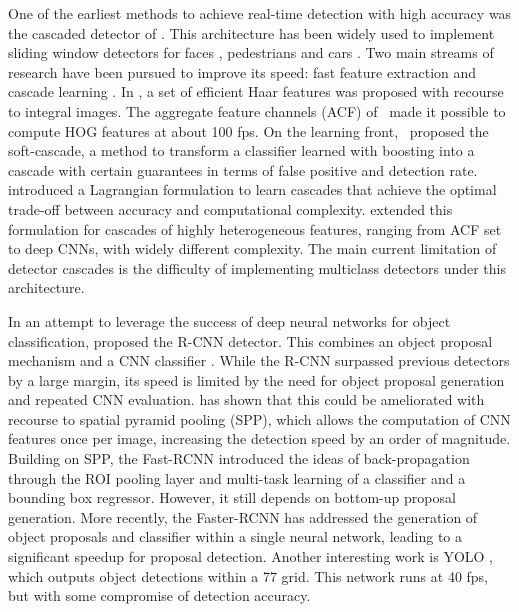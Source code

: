 \documentclass[runningheads]{llncs}
\begin{document}
One of the earliest methods to achieve real-time detection with  high
accuracy was the cascaded detector of \cite{DBLP:journals/ijcv/ViolaJ04}.
This architecture has been widely used to implement sliding window
detectors for faces \cite{DBLP:journals/ijcv/ViolaJ04,DBLP:conf/cvpr/BourdevB05}, pedestrians \cite{DBLP:journals/pami/DollarABP14,DBLP:conf/iccv/CaiSV15} and cars \cite{DBLP:journals/tits/Ohn-BarT15}.
Two main streams of research have been pursued to improve its speed:
fast feature extraction \cite{DBLP:journals/ijcv/ViolaJ04,DBLP:journals/pami/DollarABP14} and cascade learning
\cite{DBLP:conf/cvpr/BourdevB05,DBLP:journals/jmlr/SaberianV14,DBLP:conf/iccv/CaiSV15}. In \cite{DBLP:journals/ijcv/ViolaJ04}, a set
of efficient Haar features was proposed with recourse to integral images.
The aggregate feature channels (ACF) of~\cite{DBLP:journals/pami/DollarABP14}
made it possible to compute HOG features at about 100 fps. On the learning
front,~\cite{DBLP:conf/cvpr/BourdevB05} proposed the soft-cascade, a
method to transform a classifier learned with boosting  into a cascade with
certain guarantees in terms of false positive and detection rate.
\cite{DBLP:journals/jmlr/SaberianV14} introduced a Lagrangian formulation
to learn cascades that achieve the optimal trade-off between accuracy and
computational complexity. \cite{DBLP:conf/iccv/CaiSV15} extended this
formulation for cascades of highly heterogeneous features, ranging from ACF
set to deep CNNs, with widely different complexity. The main current
limitation of detector cascades is the difficulty of implementing multiclass
detectors under this architecture.

In an attempt to leverage the success of deep neural networks for object
classification, \cite{DBLP:conf/cvpr/GirshickDDM14} proposed the R-CNN
detector. This combines an object proposal mechanism
\cite{DBLP:conf/iccv/SandeUGS11} and a CNN classifier
\cite{DBLP:conf/nips/KrizhevskySH12}. While the R-CNN surpassed previous
detectors \cite{DBLP:journals/pami/FelzenszwalbGMR10,DBLP:conf/iccv/WangYZL13}
by a large margin, its speed is limited by the
need for object proposal generation and repeated CNN evaluation.
\cite{DBLP:conf/eccv/HeZR014} has shown that this could be ameliorated
with recourse to spatial pyramid pooling (SPP), which allows the computation
of CNN features once per image, increasing
the detection speed by an order of magnitude. Building on SPP,
the Fast-RCNN \cite{DBLP:conf/iccv/Girshick15} introduced
the ideas of back-propagation through the ROI pooling layer and multi-task
learning of a classifier and a bounding box regressor. However, it still
depends on bottom-up proposal generation. More recently, the
Faster-RCNN \cite{DBLP:conf/nips/shaoqing15fasterRcnn} has addressed
the generation of object proposals and classifier within a single
neural network, leading to a significant speedup for proposal detection.
Another interesting work is YOLO \cite{DBLP:conf/cvpr/RedmonDGF16}, which
outputs object detections within a 77 grid. This network runs
at 40 fps, but with some compromise of detection accuracy.
\end{document}
